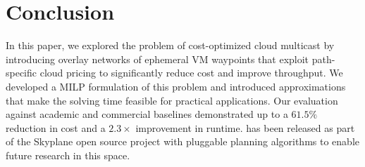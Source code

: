 \section{Conclusion}
In this paper, we explored the problem of cost-optimized cloud multicast by introducing overlay networks of ephemeral VM waypoints that exploit path-specific cloud pricing to significantly reduce cost and improve throughput.
We developed a MILP formulation of this problem and introduced approximations that make the solving time feasible for practical applications. 
Our evaluation against academic and commercial baselines demonstrated up to a $61.5\%$ reduction in cost and a $2.3\times$ improvement in runtime. 
\sys{} has been released as part of the Skyplane open source project  with pluggable planning algorithms to enable future research in this space.
